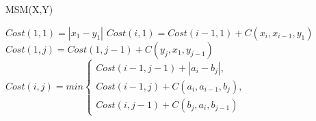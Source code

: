 \begin{algorithm}
\caption{MSM(X,Y)}
\label{algorithmeMSM}
\begin{algorithmic}[1]
\STATE $Cost(1,1) = |x_1 - y_1|$
	\STATE $Cost(i,1) = Cost(i-1,1) + C(x_i, x_{i-1},y_1)$
\ENDFOR
{}
	\STATE $Cost(1,j) = Cost(1,j-1) + C(y_j, x_{1},y_{j-1})$
\ENDFOR
{}
		\STATE $Cost(i,j) = min
				\begin{cases}
				Cost(i-1,j-1) + |a_i -b_j|, \\
				Cost(i-1, j) + C(a_i, a_{i-1},b_j), \\
				Cost(i, j-1) + C(b_j, a_{i},b_{j-1})
				\end{cases}
				$
	\ENDFOR
\ENDFOR
{}
\end{algorithmic}
\end{algorithm}


